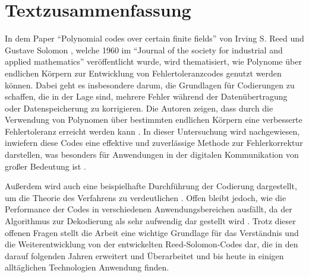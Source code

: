 \chapter{Textzusammenfassung}\label{ch:textzusammenfassung}
In dem Paper \enquote{Polynomial codes over certain finite fields} von Irving S. Reed und Gustave Solomon \cite{reedPolynomialCodesCertain1960}, welche 1960 im \enquote{Journal of the society for industrial and applied mathematics} veröffentlicht wurde, wird thematisiert, wie Polynome über endlichen Körpern zur Entwicklung von Fehlertoleranzcodes genutzt werden können. 
Dabei geht es insbesondere darum, die Grundlagen für Codierungen zu schaffen, die in der Lage sind, mehrere Fehler während der Datenübertragung oder Datenspeicherung zu korrigieren. 
Die Autoren zeigen, dass durch die Verwendung von Polynomen über bestimmten endlichen Körpern eine verbesserte Fehlertoleranz erreicht werden kann \cite[S. 300f.]{reedPolynomialCodesCertain1960}. 
In dieser Untersuchung wird nachgewiesen, inwiefern diese Codes eine effektive und zuverlässige Methode zur Fehlerkorrektur darstellen, was besonders für Anwendungen in der digitalen Kommunikation von großer Bedeutung ist \cite[S. 302]{reedPolynomialCodesCertain1960}.

Außerdem wird auch eine beispielhafte Durchführung der Codierung dargestellt, um die Theorie des Verfahrens zu verdeutlichen \cite[S. 304]{reedPolynomialCodesCertain1960}. 
Offen bleibt jedoch, wie die Performance der Codes in verschiedenen Anwendungsbereichen ausfällt, da der Algorithmus zur Dekodierung als sehr aufwendig dar gestellt wird \cite[Seite 302f.]{reedPolynomialCodesCertain1960}.
Trotz dieser offenen Fragen stellt die Arbeit eine wichtige Grundlage für das Verständnis und die Weiterentwicklung von der entwickelten Reed-Solomon-Codes dar, die in den darauf folgenden Jahren erweitert und Überarbeitet und bis heute in einigen alltäglichen Technologien Anwendung finden.